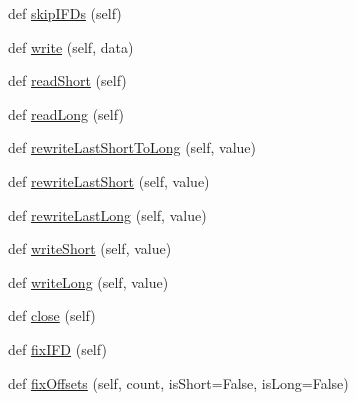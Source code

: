 \begin{DoxyCompactItemize}
\item 
def \hyperlink{classPIL_1_1TiffImagePlugin_1_1AppendingTiffWriter_aa9e15b91fbc00b59e3b671dbdb5fc475}{skip\+I\+F\+Ds} (self)
\item 
def \hyperlink{classPIL_1_1TiffImagePlugin_1_1AppendingTiffWriter_a9f27acaa049d0118f4851285be4efa7b}{write} (self, data)
\item 
def \hyperlink{classPIL_1_1TiffImagePlugin_1_1AppendingTiffWriter_ae22476382b3f1bd55dc0bf52db8dd578}{read\+Short} (self)
\item 
def \hyperlink{classPIL_1_1TiffImagePlugin_1_1AppendingTiffWriter_ab7db99161ae5d19b4d04da09d9816c96}{read\+Long} (self)
\item 
def \hyperlink{classPIL_1_1TiffImagePlugin_1_1AppendingTiffWriter_ae08b510c34d2b7d09a8d078051886142}{rewrite\+Last\+Short\+To\+Long} (self, value)
\item 
def \hyperlink{classPIL_1_1TiffImagePlugin_1_1AppendingTiffWriter_abcb4b46041da77b9b4fc3172e9475627}{rewrite\+Last\+Short} (self, value)
\item 
def \hyperlink{classPIL_1_1TiffImagePlugin_1_1AppendingTiffWriter_acacae5fe042628f31ff982ed29ad3be8}{rewrite\+Last\+Long} (self, value)
\item 
def \hyperlink{classPIL_1_1TiffImagePlugin_1_1AppendingTiffWriter_a9bce1a400a53f1401340abd9d93171ea}{write\+Short} (self, value)
\item 
def \hyperlink{classPIL_1_1TiffImagePlugin_1_1AppendingTiffWriter_a3eb73778f2fe58d573ac2417cd81f6b2}{write\+Long} (self, value)
\item 
def \hyperlink{classPIL_1_1TiffImagePlugin_1_1AppendingTiffWriter_a054f5bfc5680bf0740cb3fa1ec1468db}{close} (self)
\item 
def \hyperlink{classPIL_1_1TiffImagePlugin_1_1AppendingTiffWriter_a2eea9c095238603d2a22b5e3082bbab7}{fix\+I\+FD} (self)
\item 
def \hyperlink{classPIL_1_1TiffImagePlugin_1_1AppendingTiffWriter_a572af565d1e469d5d5cb947939ec30d3}{fix\+Offsets} (self, count, is\+Short=False, is\+Long=False)
\end{DoxyCompactItemize}
